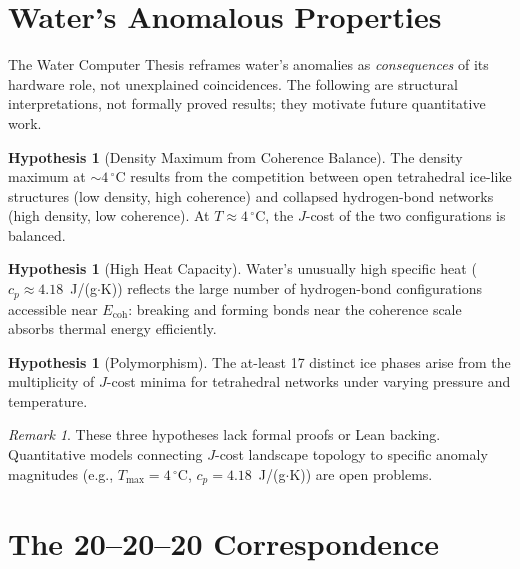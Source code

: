 \documentclass[12pt,a4paper]{article}
\theoremstyle{definition}
\newtheorem{hypothesis}[theorem]{Hypothesis}
\theoremstyle{remark}
\newtheorem{remark}[theorem]{Remark}
\begin{document}
\section{Water's Anomalous Properties}
\label{sec:anomalies}

The Water Computer Thesis reframes water's anomalies as
\emph{consequences} of its hardware role, not unexplained coincidences.
The following are structural interpretations, not formally proved
results; they motivate future quantitative work.

\begin{hypothesis}[Density Maximum from Coherence Balance]
The density maximum at $\sim 4\,^\circ$C results from the competition
between open tetrahedral ice-like structures (low density, high
coherence) and collapsed hydrogen-bond networks (high density, low
coherence).  At $T \approx 4\,^\circ$C, the $J$-cost of the two
configurations is balanced.
\end{hypothesis}

\begin{hypothesis}[High Heat Capacity]
Water's unusually high specific heat
($c_p \approx 4.18$~J/(g$\cdot$K)) reflects the large number of
hydrogen-bond configurations accessible near $E_{\mathrm{coh}}$:
breaking and forming bonds near the coherence scale absorbs thermal
energy efficiently.
\end{hypothesis}

\begin{hypothesis}[Polymorphism]
The at-least 17 distinct ice phases arise from the multiplicity of
$J$-cost minima for tetrahedral networks under varying pressure and
temperature.
\end{hypothesis}

\begin{remark}
These three hypotheses lack formal proofs or Lean backing.
Quantitative models connecting $J$-cost landscape topology to
specific anomaly magnitudes (e.g., $T_{\mathrm{max}} = 4\,^\circ$C,
$c_p = 4.18$~J/(g$\cdot$K)) are open problems.
\end{remark}

\section{The 20--20--20 Correspondence}
\label{sec:20}
\end{document}

